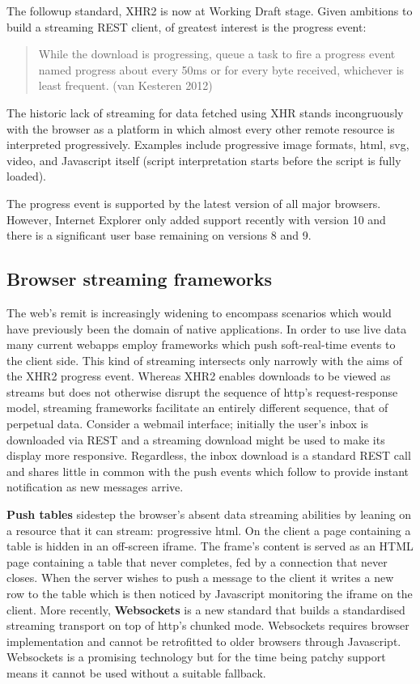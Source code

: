 \documentclass[12pt, ]{article}
\begin{document}
The followup standard, XHR2 is now at Working Draft stage. Given
ambitions to build a streaming REST client, of greatest interest is the
progress event:

\begin{quote}
While the download is progressing, queue a task to fire a progress event
named progress about every 50ms or for every byte received, whichever is
least frequent. (van Kesteren 2012)
\end{quote}

The historic lack of streaming for data fetched using XHR stands
incongruously with the browser as a platform in which almost every other
remote resource is interpreted progressively. Examples include
progressive image formats, html, svg, video, and Javascript itself
(script interpretation starts before the script is fully loaded).

The progress event is supported by the latest version of all major
browsers. However, Internet Explorer only added support recently with
version 10 and there is a significant user base remaining on versions 8
and 9.

\subsection{Browser streaming
frameworks}\label{browser-streaming-frameworks}

\label{browserstreamingframeworks}

The web's remit is increasingly widening to encompass scenarios which
would have previously been the domain of native applications. In order
to use live data many current webapps employ frameworks which push
soft-real-time events to the client side. This kind of streaming
intersects only narrowly with the aims of the XHR2 progress event.
Whereas XHR2 enables downloads to be viewed as streams but does not
otherwise disrupt the sequence of http's request-response model,
streaming frameworks facilitate an entirely different sequence, that of
perpetual data. Consider a webmail interface; initially the user's inbox
is downloaded via REST and a streaming download might be used to make
its display more responsive. Regardless, the inbox download is a
standard REST call and shares little in common with the push events
which follow to provide instant notification as new messages arrive.

\textbf{Push tables} sidestep the browser's absent data streaming
abilities by leaning on a resource that it can stream: progressive html.
On the client a page containing a table is hidden in an off-screen
iframe. The frame's content is served as an HTML page containing a table
that never completes, fed by a connection that never closes. When the
server wishes to push a message to the client it writes a new row to the
table which is then noticed by Javascript monitoring the iframe on the
client. More recently, \textbf{Websockets} is a new standard that builds
a standardised streaming transport on top of http's chunked mode.
Websockets requires browser implementation and cannot be retrofitted to
older browsers through Javascript. Websockets is a promising technology
but for the time being patchy support means it cannot be used without a
suitable fallback.
\end{document}
